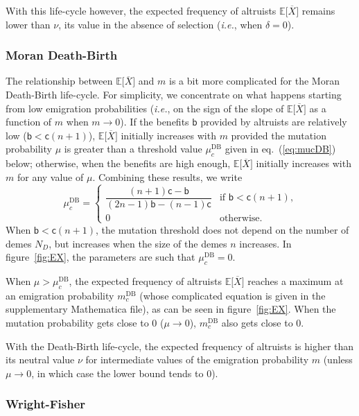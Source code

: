 \documentclass[11pt, letterpaper]{article}
\renewcommand{\eqref}[1]{\textup{{\normalfont eq.~(\ref{#1}}\normalfont)}}
\newcommand{\ie}{\textit{i.e.}}
\newcommand{\Esp}[1]{\mathbb{E}\big[ #1\big]}%
\newcommand{\bb}{\mathsf{b}}
\newcommand{\cc}{\mathsf{c}}
\newcommand{\DB}{\textrm{DB}}
\newcommand{\ndemes}{N_D}
\newcommand{\selstr}{\delta}
\begin{document}
With this life-cycle however, the expected frequency of altruists $\Esp{\overline{X}}$ remains lower than $\nu$, its value in the absence of selection (\ie, when $\selstr =0$). 

\subsubsection{Moran Death-Birth}

The relationship between $\Esp{\overline{X}}$ and $m$ is a bit more complicated for the Moran Death-Birth life-cycle. For simplicity, we concentrate on what happens starting from low emigration probabilities (\ie, on the sign of the slope of $\Esp{\overline{X}}$ as a function of $m$ when $m\to 0$). If the benefits $\bb$ provided by altruists are relatively low ($\bb < \cc (n+1)$), $\Esp{\overline{X}}$ initially increases with $m$ provided the mutation probability $\mu$ is greater than a threshold value $\mu_c^{\DB}$ given in \eqref{eq:mucDB} below; otherwise, when the benefits are high enough, $\Esp{\overline{X}}$ initially increases with $m$ for any value of $\mu$. Combining these results, we write
\begin{equation}\label{eq:mucDB}
\mu_c^{\DB} = \begin{cases}
\dfrac{ (n+1) \cc - \bb}{ (2 n - 1) \bb - (n-1) \cc} & \textrm{if $\bb < \cc (n+1)$,} \\
%
0 & \textrm{otherwise. }
\end{cases}
\end{equation} 
%
When $\bb < \cc (n+1)$, the mutation threshold does not depend on the number of demes $\ndemes$, but increases when the size of the demes $n$ increases. In figure~\ref{fig:EX}, the parameters are such that $\mu_c^{\DB} = 0$. 

When $\mu > \mu_c^{\DB}$, the expected frequency of altruists $\Esp{\overline{X}}$ reaches a maximum at an emigration probability $m_c^{\DB}$ (whose complicated equation is given in the supplementary Mathematica file), as can be seen in figure~\ref{fig:EX}. When the mutation probability gets close to $0$ ($\mu \to 0$), $m_c^{\DB}$ also gets close to $0$.

With the Death-Birth life-cycle, the expected frequency of altruists is higher than its neutral value $\nu$ for intermediate values of the emigration probability $m$ (unless $\mu \to 0$, in which case the lower bound tends to $0$).

\subsubsection{Wright-Fisher}
\end{document}
